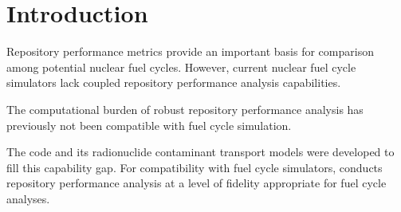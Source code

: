 \section{Introduction}\label{sec:introduction}
Repository performance metrics provide an important basis for comparison among 
potential nuclear fuel cycles. However, current nuclear fuel cycle simulators 
lack coupled repository performance analysis capabilities. 

The computational burden of robust repository performance 
analysis has previously not been compatible with fuel cycle simulation.

The \Cyder code and its radionuclide contaminant transport models were  
developed to fill this capability gap. For compatibility with fuel cycle 
simulators, \Cyder  conducts repository performance 
analysis at a level of fidelity appropriate for fuel cycle analyses.


